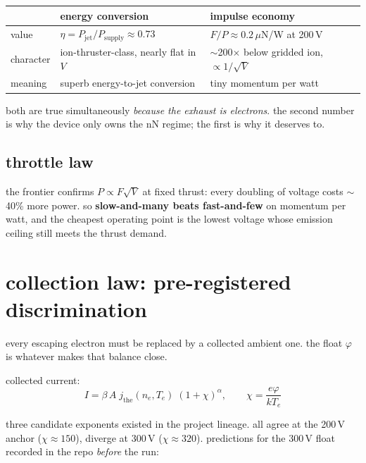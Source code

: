 \documentclass[11pt]{article}
\begin{document}
\begin{center}\small
\begin{tabular}{lll}
\toprule
 & energy conversion & impulse economy \\
\midrule
value & $\eta = P_{\mathrm{jet}}/P_{\mathrm{supply}} \approx 0.73$ &
        $F/P \approx 0.2$\,$\mu$N/W at 200\,V \\
character & ion-thruster-class, nearly flat in $V$ &
            $\sim$200$\times$ below gridded ion, $\propto 1/\sqrt{V}$ \\
meaning & superb energy-to-jet conversion &
          tiny momentum per watt \\
\bottomrule
\end{tabular}
\end{center}

both are true simultaneously \emph{because the exhaust is electrons}.  the
second number is why the device only owns the nN regime; the first is why it
deserves to.

\subsection{throttle law}

the frontier confirms $P \propto F\sqrt{V}$ at fixed thrust: every doubling
of voltage costs $\sim$40\% more power.  so \textbf{slow-and-many beats
fast-and-few} on momentum per watt, and the cheapest operating point is the
lowest voltage whose emission ceiling still meets the thrust demand.

\section{collection law: pre-registered discrimination}

every escaping electron must be replaced by a collected ambient one.  the
float $\varphi$ is whatever makes that balance close.

collected current:
\[
I = \beta\, A\; j_{\mathrm{the}}(n_e, T_e)\;(1+\chi)^{\alpha},
\qquad \chi = \frac{e\varphi}{kT_e}
\]

three candidate exponents existed in the project lineage.  all agree at the
200\,V anchor ($\chi \approx 150$), diverge at 300\,V ($\chi \approx 320$).
predictions for the 300\,V float recorded in the repo \emph{before} the run:
\end{document}
